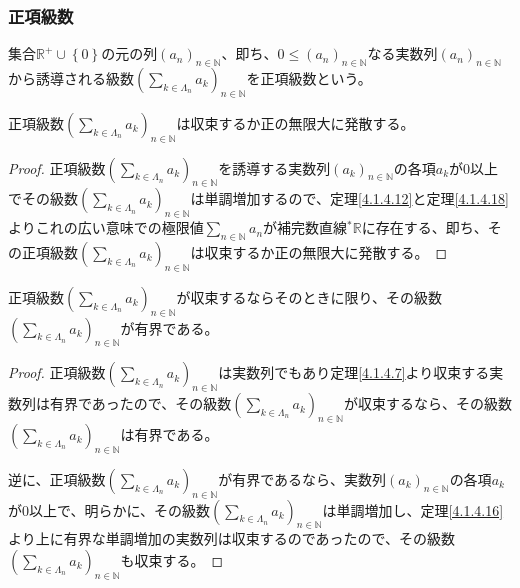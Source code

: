 \documentclass[dvipdfmx]{jsarticle}
\begin{document}
\subsubsection{正項級数}%
\begin{dfn}
集合$\mathbb{R}^{+} \cup \left\{ 0 \right\}$の元の列$\left( a_{n} \right)_{n \in \mathbb{N}}$、即ち、$0 \leq \left( a_{n} \right)_{n \in \mathbb{N}}$なる実数列$\left( a_{n} \right)_{n \in \mathbb{N}}$から誘導される級数$\left( \sum_{k \in \varLambda_{n}} a_{k} \right)_{n \in \mathbb{N}}$を正項級数という。
\end{dfn}
\begin{thm}\label{4.1.8.6}
正項級数$\left( \sum_{k \in \varLambda_{n}} a_{k} \right)_{n \in \mathbb{N}}$は収束するか正の無限大に発散する。
\end{thm}
\begin{proof}
正項級数$\left( \sum_{k \in \varLambda_{n}} a_{k} \right)_{n \in \mathbb{N}}$を誘導する実数列$\left( a_{k} \right)_{n \in \mathbb{N}}$の各項$a_{k}$が$0$以上でその級数$\left( \sum_{k \in \varLambda_{n}} a_{k} \right)_{n \in \mathbb{N}}$は単調増加するので、定理\ref{4.1.4.12}と定理\ref{4.1.4.18}よりこれの広い意味での極限値$\sum_{n \in \mathbb{N}} a_{n}$が補完数直線${}^{*}\mathbb{R}$に存在する、即ち、その正項級数$\left( \sum_{k \in \varLambda_{n}} a_{k} \right)_{n \in \mathbb{N}}$は収束するか正の無限大に発散する。
\end{proof}
\begin{thm}\label{4.1.8.7}
正項級数$\left( \sum_{k \in \varLambda_{n}} a_{k} \right)_{n \in \mathbb{N}}$が収束するならそのときに限り、その級数$\left( \sum_{k \in \varLambda_{n}} a_{k} \right)_{n \in \mathbb{N}}$が有界である。
\end{thm}
\begin{proof}
正項級数$\left( \sum_{k \in \varLambda_{n}} a_{k} \right)_{n \in \mathbb{N}}$は実数列でもあり定理\ref{4.1.4.7}より収束する実数列は有界であったので、その級数$\left( \sum_{k \in \varLambda_{n}} a_{k} \right)_{n \in \mathbb{N}}$が収束するなら、その級数$\left( \sum_{k \in \varLambda_{n}} a_{k} \right)_{n \in \mathbb{N}}$は有界である。\par
逆に、正項級数$\left( \sum_{k \in \varLambda_{n}} a_{k} \right)_{n \in \mathbb{N}}$が有界であるなら、実数列$\left( a_{k} \right)_{n \in \mathbb{N}}$の各項$a_{k}$が$0$以上で、明らかに、その級数$\left( \sum_{k \in \varLambda_{n}} a_{k} \right)_{n \in \mathbb{N}}$は単調増加し、定理\ref{4.1.4.16}より上に有界な単調増加の実数列は収束するのであったので、その級数$\left( \sum_{k \in \varLambda_{n}} a_{k} \right)_{n \in \mathbb{N}}$も収束する。
\end{proof}
\end{document}
